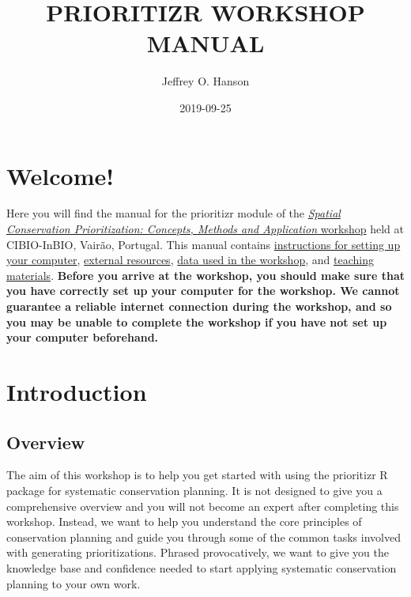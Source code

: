 \documentclass[]{book}
\title{PRIORITIZR WORKSHOP MANUAL}
\author{Jeffrey O. Hanson}
\date{2019-09-25}
\begin{document}
\maketitle

{
\setcounter{tocdepth}{1}
\tableofcontents
}
\chapter{Welcome!}\label{welcome}

Here you will find the manual for the prioritizr module of the
\href{https://cibio.up.pt/workshops--courses/details/advanced-course-spatial-conservation-prioritization-}{\emph{Spatial
Conservation Prioritization: Concepts, Methods and Application}
workshop} held at CIBIO-InBIO, Vairão, Portugal. This manual contains
\href{}{instructions for setting up your computer}, \href{}{external
resources}, \href{}{data used in the workshop}, and \href{}{teaching
materials}. \textbf{Before you arrive at the workshop, you should make
sure that you have correctly set up your computer for the workshop. We
cannot guarantee a reliable internet connection during the workshop, and
so you may be unable to complete the workshop if you have not set up
your computer beforehand.}

\chapter{Introduction}\label{introduction}

\section{Overview}\label{overview}

The aim of this workshop is to help you get started with using the
prioritizr R package for systematic conservation planning. It is not
designed to give you a comprehensive overview and you will not become an
expert after completing this workshop. Instead, we want to help you
understand the core principles of conservation planning and guide you
through some of the common tasks involved with generating
prioritizations. Phrased provocatively, we want to give you the
knowledge base and confidence needed to start applying systematic
conservation planning to your own work.
\end{document}

